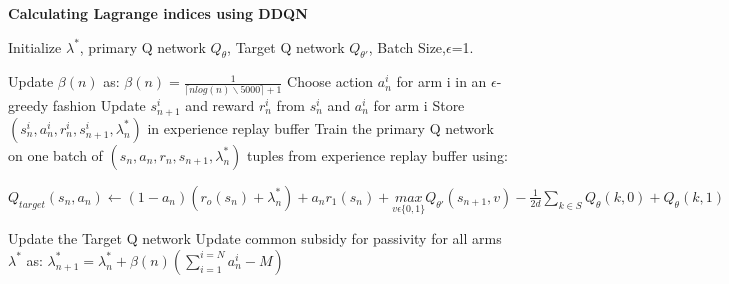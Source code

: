 \documentclass{slides}
\begin{document}
{{\newpage
\textbf{Calculating Lagrange indices using DDQN}
\begin{algorithm}[H]
\begin{small}
\begin{algorithmic}[1]
    \State Initialize $\lambda^*$, primary Q network $Q_\theta$, Target Q network $Q_{\theta'}$, Batch Size,$\epsilon$=1.

        
        \State Update $\beta(n)$ as:
        $\beta(n)=\frac{1}{\lceil{nlog(n)\backslash5000}\rceil+1}$
            \State Choose action $a_{n}^i$ for  arm i in an $\epsilon$-greedy fashion
            \State Update $s_{n+1}^i$ and reward $r_n^i$ from $s_{n}^i$ and $a_{n}^i$ for  arm i
            \State Store $(s_{n}^i,a_{n}^i,r_{n}^i,s_{n+1}^i,\lambda_n^*)$ in experience replay buffer
            \State Train the primary Q network on one batch of $(s_{n},a_{n},r_{n},s_{n+1},\lambda_n^*)$ tuples from experience replay buffer using:
            \Statex\begin{small}
            $Q_{target}(s_n,a_n)\gets(1-a_n)(r_o(s_n)+\lambda_n^*)+a_nr_1(s_n)+\underset{v\epsilon\{0,1\}}{max}Q_{\theta'}(s_{n+1},v)-\frac{1}{2d}\sum\limits_{k\in S}Q_{\theta}(k,0)+Q_{\theta}(k,1)$\end{small}
        \EndFor
        \State Update the Target Q network 
        \State Update common subsidy for passivity for all arms $\lambda^*$ as: $\lambda_{n+1}^*=\lambda_n^*+\beta(n)(\sum\limits_{i=1}^{i=N}a_n^i-M)$
        

\end{algorithmic}
\end{small}
\end{algorithm}}}
\end{document}

